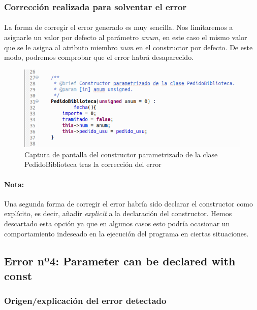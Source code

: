	\subsubsection{Corrección realizada para solventar el error}
	
			\paragraph{}La forma de corregir el error generado es muy sencilla. Nos limitaremos a asignarle un valor por defecto al parámetro \textit{anum}, en este caso el mismo valor que se le asigna al atributo miembro \textit{num} en el constructor por defecto. De este modo, podremos comprobar que el error habrá desaparecido.
			
			\begin{figure}[H]
				\centering
				\includegraphics[scale=0.7]{img/captura53.png}
				\caption{Captura de pantalla del constructor parametrizado de la clase PedidoBiblioteca tras la corrección del error}
				\label{captura53}
			\end{figure}
		
			\paragraph{Nota:} Una segunda forma de corregir el error habría sido declarar el constructor como explícito, es decir, añadir \textit{explicit} a la declaración del constructor. Hemos descartado esta opción ya que en algunos casos esto podría ocasionar un comportamiento indeseado en la ejecución del programa en ciertas situaciones.

	\subsection{Error nº4: Parameter can be declared with const}
	
		\subsubsection{Origen/explicación del error detectado}
		
